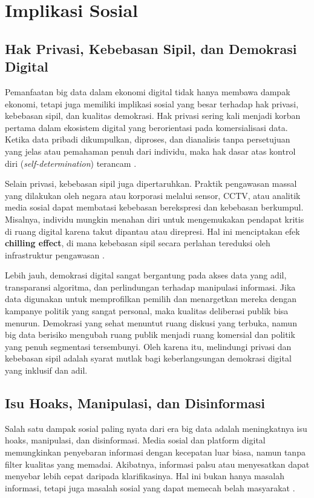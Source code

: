 \section{Implikasi Sosial}

\subsection{Hak Privasi, Kebebasan Sipil, dan Demokrasi Digital}

Pemanfaatan big data dalam ekonomi digital tidak hanya membawa dampak ekonomi, tetapi juga memiliki implikasi sosial yang besar terhadap hak privasi, kebebasan sipil, dan kualitas demokrasi. Hak privasi sering kali menjadi korban pertama dalam ekosistem digital yang berorientasi pada komersialisasi data. Ketika data pribadi dikumpulkan, diproses, dan dianalisis tanpa persetujuan yang jelas atau pemahaman penuh dari individu, maka hak dasar atas kontrol diri (\textit{self-determination}) terancam \cite{nissenbaum2004privacy}.  

Selain privasi, kebebasan sipil juga dipertaruhkan. Praktik pengawasan massal yang dilakukan oleh negara atau korporasi melalui sensor, CCTV, atau analitik media sosial dapat membatasi kebebasan berekspresi dan kebebasan berkumpul. Misalnya, individu mungkin menahan diri untuk mengemukakan pendapat kritis di ruang digital karena takut dipantau atau direpresi. Hal ini menciptakan efek \textbf{chilling effect}, di mana kebebasan sipil secara perlahan tereduksi oleh infrastruktur pengawasan \cite{zuboff2019age}.  

Lebih jauh, demokrasi digital sangat bergantung pada akses data yang adil, transparansi algoritma, dan perlindungan terhadap manipulasi informasi. Jika data digunakan untuk memprofilkan pemilih dan menargetkan mereka dengan kampanye politik yang sangat personal, maka kualitas deliberasi publik bisa menurun. Demokrasi yang sehat menuntut ruang diskusi yang terbuka, namun big data berisiko mengubah ruang publik menjadi ruang komersial dan politik yang penuh segmentasi tersembunyi. Oleh karena itu, melindungi privasi dan kebebasan sipil adalah syarat mutlak bagi keberlangsungan demokrasi digital yang inklusif dan adil.

\subsection{Isu Hoaks, Manipulasi, dan Disinformasi}

Salah satu dampak sosial paling nyata dari era big data adalah meningkatnya isu hoaks, manipulasi, dan disinformasi. Media sosial dan platform digital memungkinkan penyebaran informasi dengan kecepatan luar biasa, namun tanpa filter kualitas yang memadai. Akibatnya, informasi palsu atau menyesatkan dapat menyebar lebih cepat daripada klarifikasinya. Hal ini bukan hanya masalah informasi, tetapi juga masalah sosial yang dapat memecah belah masyarakat \cite{lazer2018science}.  

